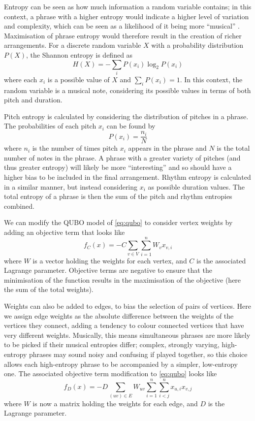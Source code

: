 \documentclass[twocolumn]{article}
\theoremstyle{definition}
\begin{document}
Entropy can be seen as how much information a random variable contains; in this context, a phrase with a higher entropy would indicate a higher level of variation and complexity, which can be seen as a likelihood of it being more ``musical'' \cite{li_entropy_2019}. Maximisation of phrase entropy would therefore result in the creation of richer arrangements. For a discrete random variable $X$ with a probability distribution $P(X)$, the Shannon entropy is defined as
\begin{equation}
    H(X)=-\sum_i P(x_i)\log_2 P(x_i)
    \label{eq:entropy}
\end{equation}
where each $x_i$ is a possible value of $X$ and ${\sum_i P(x_i)=1}$. In this context, the random variable is a musical note, considering its possible values in terms of both pitch and duration.

Pitch entropy is calculated by considering the distribution of pitches in a phrase. The probabilities of each pitch $x_i$ can be found by
\begin{equation}
    P(x_i)=\frac{n_i}{N}
    \label{eq:prob-dist}
\end{equation}
where $n_i$ is the number of times pitch $x_i$ appears in the phrase and $N$ is the total number of notes in the phrase. A phrase with a greater variety of pitches (and thus greater entropy) will likely be more ``interesting'' and so should have a higher bias to be included in the final arrangement.
Rhythm entropy is calculated in a similar manner, but instead considering $x_i$ as possible duration values.
The total entropy of a phrase is then the sum of the pitch and rhythm entropies combined.

We can modify the QUBO model of \cref{eq:qubo} to consider vertex weights by adding an objective term that looks like
\begin{equation}
    f_C(x)=-C\sum_{v\in V}\sum_{i=1}^n W_v x_{v,i}
\end{equation}
where $W$ is a vector holding the weights for each vertex, and $C$ is the associated Lagrange parameter. Objective terms are negative to ensure that the minimisation of the function results in the maximisation of the objective (here the sum of the total weights).

Weights can also be added to edges, to bias the selection of pairs of vertices. Here we assign edge weights as the absolute difference between the weights of the vertices they connect, adding a tendency to colour connected vertices that have very different weights. Musically, this means simultaneous phrases are more likely to be picked if their musical entropies differ; complex, strongly varying, high-entropy phrases may sound noisy and confusing if played together, so this choice allows each high-entropy phrase to be accompanied by a simpler, low-entropy one. The associated objective term modification to \cref{eq:qubo} looks like
\begin{equation}
    f_D(x)=-D\sum_{(uv)\in E}W_{uv}\sum_{i=1}^n\sum_{i<j}^n x_{u,i}x_{v,j}
\end{equation}
where $W$ is now a matrix holding the weights for each edge, and $D$ is the Lagrange parameter.
\end{document}

